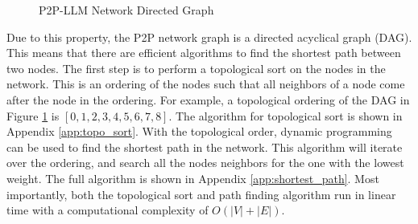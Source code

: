 \documentclass[preprint,twoside,11pt]{article}
\begin{document}
\begin{figure}
	\centering
	\caption{P2P-LLM Network Directed Graph}
	\label{fig:layered_graph}
\end{figure}

Due to this property, the P2P network graph is a directed acyclical graph (DAG). This means that there are efficient
algorithms to find the shortest path between two nodes. The first step is to perform a topological sort on the nodes in the network.
This is an ordering of the nodes such that all neighbors of a node come after the node in the ordering.
For example, a topological ordering of the DAG in Figure \ref{fig:layered_graph} is $[0,1,2,3,4,5,6,7,8]$.
The algorithm for topological sort is shown in Appendix \ref{app:topo_sort}. With the topological order, dynamic programming can be used to find the shortest path in the network.
This algorithm will iterate over the ordering, and search all the nodes neighbors for the one with the lowest weight.
The full algorithm is shown in Appendix \ref{app:shortest_path}. Most importantly, both the topological sort and path finding algorithm run in linear time
with a computational complexity of $O(|V| + |E|)$.
\end{document}
